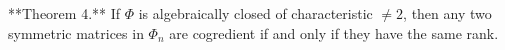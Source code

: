 **Theorem 4.** If $\Phi$ is algebraically closed of characteristic $\neq 2$, then any two symmetric matrices in $\Phi_n$ are cogredient if and only if they have the same rank.
